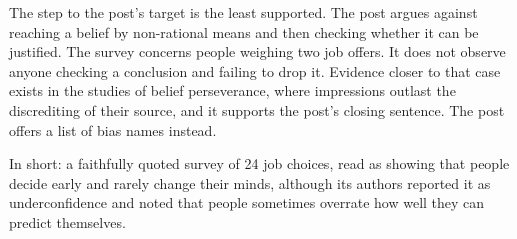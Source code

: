 \begin{afterword}
The step to the post's target is the least supported. The post argues against reaching a belief by non-rational means and then checking whether it can be justified. The survey concerns people weighing two job offers. It does not observe anyone checking a conclusion and failing to drop it. Evidence closer to that case exists in the studies of belief perseverance, where impressions outlast the discrediting of their source, and it supports the post's closing sentence. The post offers a list of bias names instead.

In short: a faithfully quoted survey of 24 job choices, read as showing that people decide early and rarely change their minds, although its authors reported it as underconfidence and noted that people sometimes overrate how well they can predict themselves.
\end{afterword}
